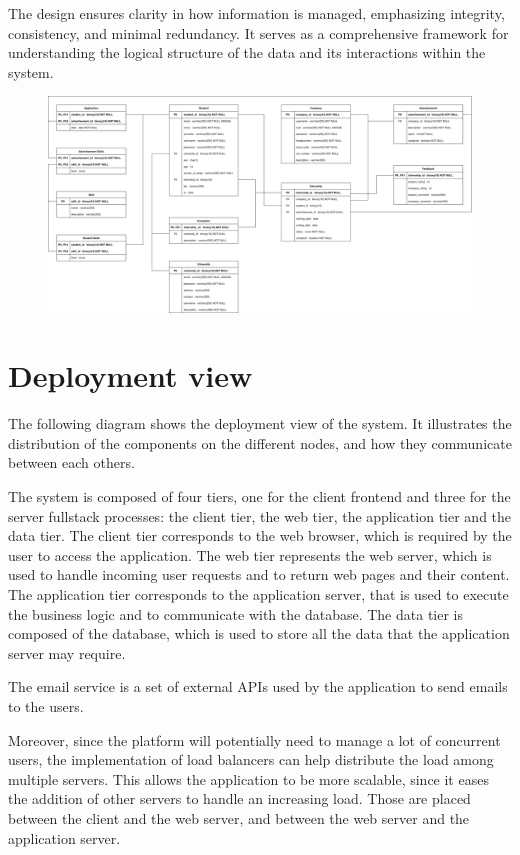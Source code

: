 The design ensures clarity in how information is managed, emphasizing integrity, consistency, and minimal redundancy.
It serves as a comprehensive framework for understanding the logical structure of the data and its interactions within the system.

\begin{figure}[H]
    \centering
    \includegraphics[width=0.8\linewidth]{../../assets/er-diagrams/er-diagram.png}
\end{figure}

\section{Deployment view}

The following diagram shows the deployment view of the system.
It illustrates the distribution of the components on the different nodes, and how they communicate between each others.

The system is composed of four tiers, one for the client frontend and three for the server fullstack processes: the client tier, the web tier, the application tier and the data tier.
The client tier corresponds to the web browser, which is required by the user to access the application.
The web tier represents the web server, which is used to handle incoming user requests and to return web pages and their content.
The application tier corresponds to the application server, that is used to execute the business logic and to communicate with the database.
The data tier is composed of the database, which is used to store all the data that the application server may require.

The email service is a set of external APIs used by the application to send emails to the users.

Moreover, since the platform will potentially need to manage a lot of concurrent users, the implementation of load balancers can help distribute the load among multiple servers.
This allows the application to be more scalable, since it eases the addition of other servers to handle an increasing load.
Those are placed between the client and the web server, and between the web server and the application server.

